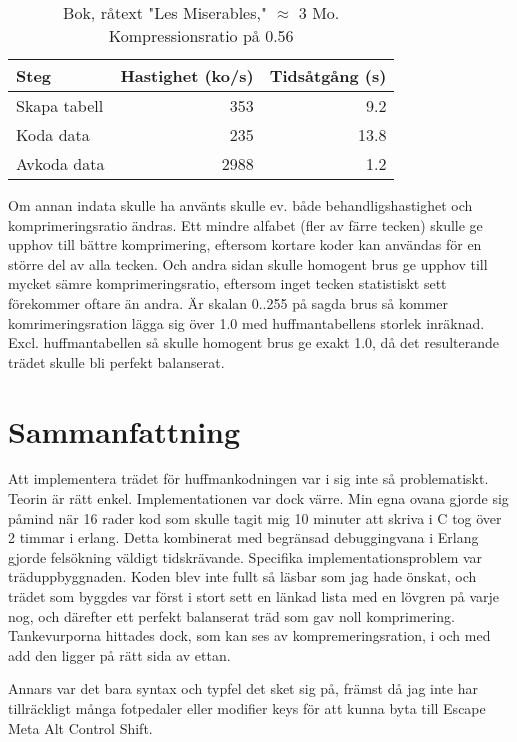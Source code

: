 \documentclass[a4paper, 11pt]{article}
\begin{document}
\begin{table}
\centering
\begin{tabular}{|l|r|r|}  
\hline
Steg & Hastighet (ko/s) & Tidsåtgång (s) \\
\hline
Skapa tabell & 353 & 9.2 \\
\hline
Koda data & 235 & 13.8 \\
\hline
Avkoda data & 2988 & 1.2 \\
\hline
\end{tabular}
\caption{Bok, råtext "Les Miserables," $\approx$ 3 Mo. Kompressionsratio på 0.56}
\label{tab:results3}
\end{table}


Om annan indata skulle ha använts skulle ev. både behandligshastighet och komprimeringsratio ändras. Ett mindre alfabet (fler av färre tecken) skulle ge upphov till bättre komprimering, eftersom kortare koder kan användas för en större del av alla tecken. Och andra sidan skulle homogent brus ge upphov till mycket sämre komprimeringsratio, eftersom inget tecken statistiskt sett förekommer oftare än andra. Är skalan 0..255 på sagda brus så kommer komrimeringsration lägga sig över 1.0 med huffmantabellens storlek inräknad. Excl. huffmantabellen så skulle homogent brus ge exakt 1.0, då det resulterande trädet skulle bli perfekt balanserat.



\section{Sammanfattning}

Att implementera trädet för huffmankodningen var i sig inte så problematiskt. Teorin är rätt enkel. Implementationen var dock värre. Min egna ovana gjorde sig påmind när 16 rader kod som skulle tagit mig 10 minuter att skriva i C tog över 2 timmar i erlang. Detta kombinerat med begränsad debuggingvana i Erlang gjorde felsökning väldigt tidskrävande. Specifika implementationsproblem var träduppbyggnaden. Koden blev inte fullt så läsbar som jag hade önskat, och trädet som byggdes var först i stort sett en länkad lista med en lövgren på varje nog, och därefter ett perfekt balanserat träd som gav noll komprimering. Tankevurporna hittades dock, som kan ses av kompremeringsration, i och med add den ligger på rätt sida av ettan.

Annars var det bara syntax och typfel det sket sig på, främst då jag inte har tillräckligt många fotpedaler eller modifier keys för att kunna byta till Escape Meta Alt Control Shift.
\end{document}
